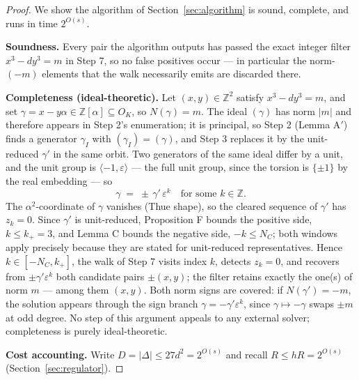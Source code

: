 \documentclass[11pt]{amsart}
\theoremstyle{plain}
\theoremstyle{remark}
\begin{document}
\begin{proof}
We show the algorithm of Section~\ref{sec:algorithm} is sound,
complete, and runs in time $2^{O(s)}$.

\textbf{Soundness.} Every pair the algorithm outputs has passed the
exact integer filter $x^3 - dy^3 = m$ in Step 7, so no false
positives occur --- in particular the norm-$(-m)$ elements that the
walk necessarily emits are discarded there.

\textbf{Completeness (ideal-theoretic).} Let
$(x, y) \in \mathbb{Z}^2$ satisfy $x^3 - dy^3 = m$, and set
$\gamma = x - y\alpha \in \mathbb{Z}[\alpha] \subseteq O_K$, so
$N(\gamma) = m$. The ideal $(\gamma)$ has norm $|m|$ and therefore
appears in Step 2's enumeration; it is principal, so Step 2
(Lemma A$'$) finds a generator $\gamma_I$ with
$(\gamma_I) = (\gamma)$, and Step 3 replaces it by the unit-reduced
$\gamma'$ in the same orbit. Two generators of the same ideal differ
by a unit, and the unit group is $\langle -1, \varepsilon\rangle$ ---
the full unit group, since the torsion is $\{\pm 1\}$ by the real
embedding --- so
\[
\gamma \;=\; \pm\,\gamma'\,\varepsilon^{k}
\quad\text{for some } k \in \mathbb{Z}.
\]
The $\alpha^2$-coordinate of $\gamma$ vanishes (Thue shape), so the
cleared sequence of $\gamma'$ has $z_k = 0$. Since $\gamma'$ is
unit-reduced, Proposition F bounds the positive side,
$k \le k_+ = 3$, and Lemma C bounds the negative side,
$-k \le N_C$; both windows apply precisely because they are stated
for unit-reduced representatives. Hence $k \in [-N_C, k_+]$, the walk
of Step 7 visits index $k$, detects $z_k = 0$, and recovers from
$\pm\gamma'\varepsilon^k$ both candidate pairs $\pm(x, y)$; the
filter retains exactly the one(s) of norm $m$ --- among them
$(x, y)$. Both norm signs are covered: if $N(\gamma') = -m$, the
solution appears through the sign branch
$\gamma = -\gamma'\varepsilon^k$, since $\gamma \mapsto -\gamma$
swaps $\pm m$ at odd degree. No step of this argument appeals to any
external solver; completeness is purely ideal-theoretic.

\textbf{Cost accounting.} Write $D = |\Delta| \le 27d^2 = 2^{O(s)}$
and recall $R \le hR = 2^{O(s)}$ (Section~\ref{sec:regulator}).


\end{proof}
\end{document}
